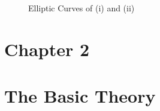 \documentclass[a4paper, 12pt]{article}
\begin{document}
\begin{figure}
    \centering
    \qquad
    \caption{Elliptic Curves of (i) and (ii)}
    \label{fig:example}
\end{figure}
\section{Chapter 2}
\section*{The Basic Theory}
\end{document}
